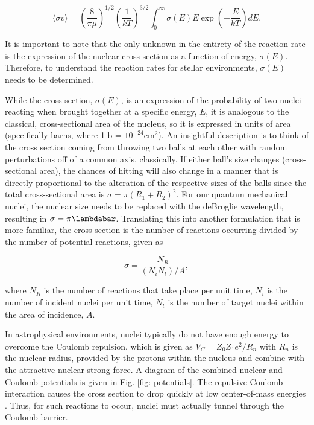 \begin{equation}
\langle \sigma v \rangle = \left( \frac{8}{\pi \mu} \right) ^{1/2} \left( \frac{1}{kT} \right) ^{3/2} \int_{0}^{\infty} \sigma (E) E \exp \left(-\dfrac{E}{kT} \right) dE.
\label{eqn: rr full}
\end{equation}

\noindent It is important to note that the only unknown in the entirety of the reaction rate is the expression of the nuclear cross section as a function of energy, $\sigma(E)$.  Therefore, to understand the reaction rates for stellar environments, $\sigma(E)$ needs to be determined. 

While the cross section, $\sigma(E)$, is an expression of the probability of two nuclei reacting when brought together at a specific energy, $E$, it is analogous to the classical, cross-sectional area of the nucleus, so it is expressed in units of area (specifically barns, where 1 b = $10^{-24}$cm$^{2}$). An insightful description is to think of the cross section coming from throwing two balls at each other with random perturbations off of a common axis, classically. If either ball's size changes (cross-sectional area), the chances of hitting will also change in a manner that is directly proportional to the alteration of the respective sizes of the balls since the total cross-sectional area is $\sigma = \pi (R_{1} + R_{2})^{2}$. For our quantum mechanical nuclei, the nuclear size needs to be replaced with the deBroglie wavelength, resulting in $\sigma = \pi \lambdabar$. Translating this into another formulation that is more familiar, the cross section is the number of reactions occurring divided by the number of potential reactions, given as

\begin{equation}
\sigma = \dfrac{N_{R}}{(N_{i} N_{t})/A},
\end{equation}

\noindent where $N_{R}$ is the number of reactions that take place per unit time, $N_{i}$ is the number of incident nuclei per unit time, $N_{t}$ is the number of target nuclei within the area of incidence, $A$. 

In astrophysical environments, nuclei typically do not have enough energy to overcome the Coulomb repulsion, which is given as $V_{C} = Z_{0}Z_{1}e^{2}/R_{n}$ with $R_{n}$ is the nuclear radius, provided by the protons within the nucleus and combine with the attractive nuclear strong force. A diagram of the combined nuclear and Coulomb potentials is given in Fig. \ref{fig: potentials}. The repulsive Coulomb interaction causes the cross section to drop quickly at low center-of-mass energies \cite{IliadisBook}. Thus, for such reactions to occur, nuclei must actually tunnel through the Coulomb barrier. 

